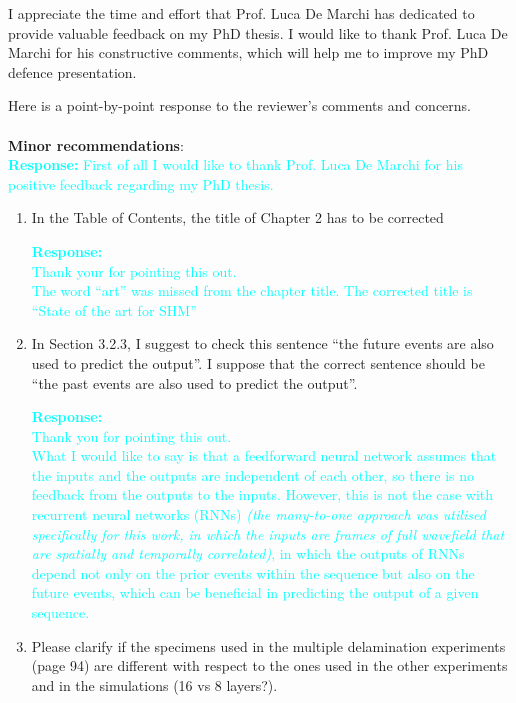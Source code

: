 \documentclass[11pt,a2paper]{report}
\begin{document}
	
	\noindent I appreciate the time and effort that Prof. Luca De Marchi has dedicated to provide valuable feedback on my PhD thesis. 
	I would like to thank Prof. Luca De Marchi for his constructive comments, which will help me to improve my PhD defence presentation. 

	\noindent Here is a point-by-point response to the reviewer’s comments and concerns.
	\\ \\
	\textbf{Minor recommendations}: \\
	\textcolor{Cyan}{
		\newline\textbf{Response:}
	First of all I would like to thank Prof. Luca De Marchi for his positive feedback regarding my PhD thesis.
	}
	\begin{enumerate}
		\item In the Table of Contents, the title of Chapter 2 has to be corrected
		
		\textcolor{Cyan}{
			\textbf{Response:}
			\\
			Thank your for pointing this out. \\
			The word \enquote{art} was missed from the chapter title. The corrected title is \enquote{State of the art for SHM}
			}				
		\item In Section 3.2.3, I suggest to check this sentence “the future events are also used to
		predict the output”. I suppose that the correct sentence should be “the past events are
		also used to predict the output”.
		
		\textcolor{Cyan}{
			\textbf{Response:\\}
			Thank you for pointing this out. \\
			What I would like to say is that a feedforward neural network assumes that the inputs and the outputs are independent of each other, so there is no feedback from the outputs to the inputs.
			However, this is not the case with recurrent neural networks (RNNs) \emph{(the many-to-one approach was utilised specifically for this work, in which the inputs are frames of full wavefield that are spatially and temporally correlated)}, in which the outputs of RNNs depend not only on the prior events within the sequence but also on the future events, which can be beneficial in predicting the output of a given sequence.
		}
		
		\item Please clarify if the specimens used in the multiple delamination experiments (page 94)
		are different with respect to the ones used in the other experiments and in the simulations (16 vs 8 layers?).
		

\end{enumerate}
\end{document}
